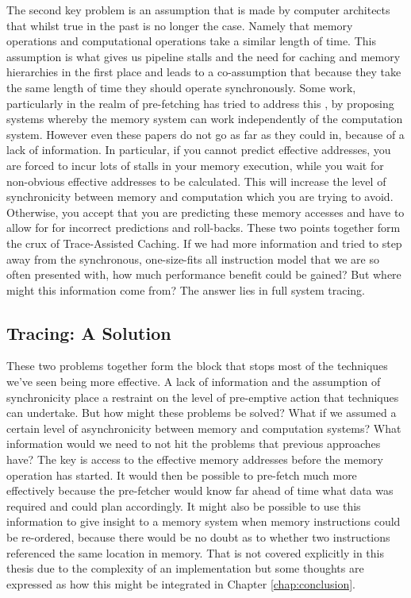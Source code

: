 The second key problem is an assumption that is made by computer architects that whilst true in the past is no longer the case. Namely that memory operations and computational operations take a similar length of time. This assumption is what gives us pipeline stalls and the need for caching and memory hierarchies in the first place and leads to a co-assumption that because they take the same length of time they should operate synchronously. Some work, particularly in the realm of pre-fetching has tried to address this \cite{veidenbaumDecoupledAccessDRAM1997, vanderwielCompilerassistedDataPrefetch1999, mutluRunaheadExecutionAlternative2003}, by proposing systems whereby the memory system can work independently of the computation system. However even these papers do not go as far as they could in, because of a lack of information. In particular, if you cannot predict effective addresses, you are forced to incur lots of stalls in your memory execution, while you wait for non-obvious effective addresses to be calculated. This will increase the level of synchronicity between memory and computation which you are trying to avoid. Otherwise, you accept that you are predicting these memory accesses and have to allow for for incorrect predictions and roll-backs. These two points together form the crux of Trace-Assisted Caching. If we had more information and tried to step away from the synchronous, one-size-fits all instruction model that we are so often presented with, how much performance benefit could be gained? But where might this information come from? The answer lies in full system tracing. 

\subsection{Tracing: A Solution}

These two problems together form the block that stops most of the techniques we've seen being more effective. A lack of information and the assumption of synchronicity place a restraint on the level of pre-emptive action that techniques can undertake. But how might these problems be solved? What if we assumed a certain level of asynchronicity between memory and computation systems? What information would we need to not hit the problems that previous approaches have? The key is access to the effective memory addresses before the memory operation has started. It would then be possible to pre-fetch much more effectively because the pre-fetcher would know far ahead of time what data was required and could plan accordingly. It might also be possible to use this information to give insight to a memory system when memory instructions could be re-ordered, because there would be no doubt as to whether two instructions referenced the same location in memory. That is not covered explicitly in this thesis due to the complexity of an implementation but some thoughts are expressed as how this might be integrated in Chapter \ref{chap:conclusion}.

